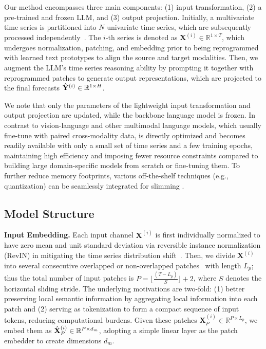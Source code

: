 Our method encompasses three main components: (1) input transformation, (2) a pre-trained and frozen LLM, and (3) output projection. Initially, a multivariate time series is partitioned into $N$ univariate time series, which are subsequently processed independently~\citep{nie2022time}. The $i$-th series is denoted as $\mathbf{X}^{(i)} \in \mathbb{R}^{1 \times T}$, which undergoes normalization, patching, and embedding prior to being reprogrammed with learned text prototypes to align the source and target modalities. Then, we augment the LLM's time series reasoning ability by prompting it together with reprogrammed patches to generate output representations, which are projected to the final forecasts $\Hat{\mathbf{Y}}^{(i)} \in \mathbb{R}^{1 \times H}$.

We note that only the parameters of the lightweight input transformation and output projection are updated, while the backbone language model is frozen. In contrast to vision-language and other multimodal language models, which usually fine-tune with paired cross-modality data, \method is directly optimized and becomes readily available with only a small set of time series and a few training epochs, maintaining high efficiency and imposing fewer resource constraints compared to building large domain-specific models from scratch or fine-tuning them. To further reduce memory footprints, various off-the-shelf techniques (e.g., quantization) can be seamlessly integrated for slimming \method.

\subsection{Model Structure}

\noindent\textbf{Input Embedding.}
Each input channel $\mathbf{X}^{(i)}$ is first individually normalized to have zero mean and unit standard deviation via reversible instance normalization (RevIN) in mitigating the time series distribution shift~\citep{kim2021reversible}. Then, we divide $\mathbf{X}^{(i)}$ into several consecutive overlapped or non-overlapped patches~\citep{nie2022time} with length $L_p$; thus the total number of input patches is $P = \lfloor \frac{(T - L_p)}{S} \rfloor + 2$, where $S$ denotes the horizontal sliding stride. The underlying motivations are two-fold: (1) better preserving local semantic information by aggregating local information into each patch and (2) serving as tokenization to form a compact sequence of input tokens, reducing computational burdens. Given these patches $\mathbf{X}^{(i)}_{P} \in \mathbb{R}^{P \times L_p}$, we embed them as $\Hat{\mathbf{X}}^{(i)}_{P} \in \mathbb{R}^{P \times d_{m}}$, adopting a simple linear layer as the patch embedder to create dimensions $d_{m}$.


